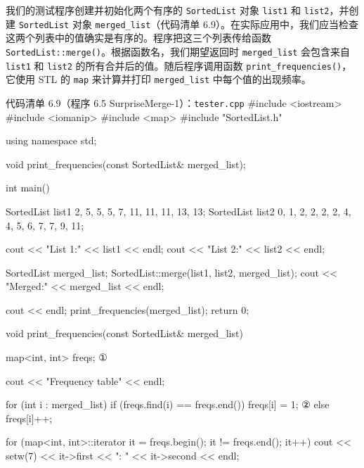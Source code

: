 我们的测试程序创建并初始化两个有序的 \texttt{Sorted\allowbreak{}List} 对象 \texttt{list1} 和 \texttt{list2}，并创建 \texttt{Sorted\allowbreak{}List} 对象 \texttt{merged\_\allowbreak{}list}（代码清单 6.9）。在实际应用中，我们应当检查这两个列表中的值确实是有序的。程序把这三个列表传给函数 \texttt{Sorted\allowbreak{}List::\allowbreak{}merge(\allowbreak{})\allowbreak{}}。根据函数名，我们期望返回时 \texttt{merged\_\allowbreak{}list} 会包含来自 \texttt{list1} 和 \texttt{list2} 的所有合并后的值。随后程序调用函数 \texttt{print\_\allowbreak{}frequencies(\allowbreak{})\allowbreak{}}，它使用 STL 的 \texttt{map} 来计算并打印 \texttt{merged\_\allowbreak{}list} 中每个值的出现频率。

\begin{codeboxt}{代码清单 6.9（程序 6.5 SurpriseMerge-1）：\texttt{tester.\allowbreak{}cpp}}
#include <iostream>
#include <iomanip>
#include <map>
#include "SortedList.h"

using namespace std;

void print_frequencies(const SortedList& merged_list);

int main()
{
    SortedList list1 {2, 5, 5, 5, 7, 11, 11, 11, 13, 13};
    SortedList list2 {0, 1, 2, 2, 2, 2, 4, 4, 5, 6, 7, 7, 9, 11};

    cout << "List 1:" << list1 << endl;
    cout << "List 2:" << list2 << endl;

    SortedList merged_list;
    SortedList::merge(list1, list2, merged_list);
    cout << "Merged:" << merged_list << endl;

    cout << endl;
    print_frequencies(merged_list);
    return 0;
}

void print_frequencies(const SortedList& merged_list)
{
    map<int, int> freqs;                                   ①

    cout << "Frequency table" << endl;

    for (int i : merged_list)
    {
        if (freqs.find(i) == freqs.end()) freqs[i] = 1;    ②
        else                              freqs[i]++;
    }

    for (map<int, int>::iterator it = freqs.begin();
         it != freqs.end(); it++)
    {
        cout << setw(7) << it->first << ": " << it->second << endl;
    }
}
\end{codeboxt}
\par
{}\par

